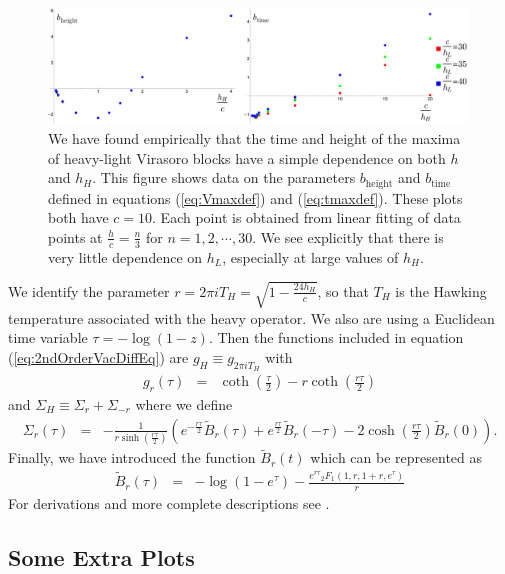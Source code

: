 \documentclass[12pt]{article}
\numberwithin{equation}{section}
\newcommand{\be}{\begin{eqnarray}}
\newcommand{\ee}{\end{eqnarray}}
\begin{document}
\begin{figure}[h]
\begin{centering}
\includegraphics[width=0.99\textwidth]{bparameterdata}
\caption{ We have found empirically that the time and height of the maxima of heavy-light Virasoro blocks have a simple dependence on both $h$ and $h_H$.  This figure shows data on the parameters $b_\text{height}$ and $b_\text{time}$ defined in equations (\ref{eq:Vmaxdef}) and (\ref{eq:tmaxdef}).  These plots both have $c=10$. Each point is obtained from linear fitting of data points at $\frac{h}{c} = \frac{n}{3}$ for $n = 1, 2, \cdots, 30$.    We see explicitly that there is very little dependence on $h_L$, especially at large values of $h_H$. }
\label{fig:bparameterdata}
\end{centering}
\end{figure}


We identify the parameter $r = 2 \pi i T_H = \sqrt{1 - \frac{24 h_H}{c}}$, so that $T_H$ is the Hawking temperature associated with the heavy operator.  We also are using a Euclidean time variable $\tau = - \log(1-z)$. Then the functions included in equation (\ref{eq:2ndOrderVacDiffEq}) are $g_H \equiv g_{2 \pi i T_H}$ with
\be
g_r(\tau) &=& \coth \left( \frac{\tau}{2} \right) - r \coth \left( \frac{r \tau}{2} \right)
\ee
and $\Sigma_H \equiv \Sigma_r + \Sigma_{-r}$ where we define
\be
\Sigma_r(\tau) &=&
-\frac{1}{r \sinh \left( \frac{r \tau}{2} \right)} \left( e^{- \frac{ r \tau}{2}} \tilde{B}_r(\tau) + e^{\frac{r \tau}{2}} \tilde{B}_r(-\tau) -2 \cosh \left( \frac{r \tau}{2} \right) \tilde{B}_r(0) \right).
\ee
Finally, we have introduced the function $\tilde{B}_r(t)$ which can be represented as
\be
\tilde{B}_r(\tau)  &=& -\log(1-e^{\tau}) - \frac{e^{ r \tau} {}_2F_1(1,r,1+r,e^\tau)}{r} 
 \label{eq:UpsHyp}
\ee
For derivations and more complete descriptions see \cite{Fitzpatrick:2016ive}.




\subsection{Some Extra Plots}
\end{document}
